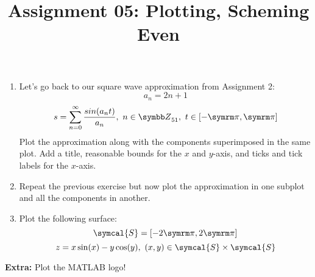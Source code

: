 \documentclass{article}
\title{Assignment 05: Plotting, Scheming Even}
\begin{document}
\renderTitle

\begin{enumerate}[leftmargin=*]
	\item
		Let's go back to our square wave approximation from
		Assignment 2:
		\begin{equation}
			a_n = 2n + 1
		\end{equation}
		\begin{equation}
			s
			=
			\sum_{n = 0}^\infty
			\frac{sin(a_n t)}{a_n},
			\ n \in \Z_{51},
			\ t \in [-\cpi, \cpi]
		\end{equation}
		Plot the approximation along with the components
		superimposed in the same plot.  Add a title, reasonable
		bounds for the \(x\) and \(y\)-axis, and ticks and tick
		labels for the \(x\)-axis.

	\item
		Repeat the previous exercise but now plot the
		approximation in one subplot and all the components in
		another.

	\item
		Plot the following surface:
		\begin{equation}
			\symcal{S} = [-2\cpi, 2\cpi]
		\end{equation}
		\begin{equation}
			z = x\sin(x) - y\cos(y),
			\ (x, y) \in \symcal{S} \times \symcal{S}
		\end{equation}
\end{enumerate}

\textbf{Extra:} Plot the MATLAB logo!
\end{document}

